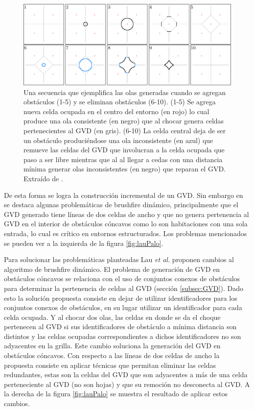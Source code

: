 \begin{figure}[H]
  \center
  \includegraphics[width=1\linewidth]{imagenes/wavesKalra.png}
  \caption[Olas de brushfire dinámico.]{Una secuencia que ejemplifica las olas generadas cuando se agregan obstáculos (1-5) y se eliminan obstáculos (6-10). (1-5) Se agrega nueva celda ocupada en el centro del entorno (en rojo) lo cual produce una ola consistente (en negro) que al chocar genera celdas pertenecientes al GVD (en gris). (6-10) La celda central deja de ser un obstáculo produciéndose una ola inconsistente (en azul) que remueve las celdas del GVD que involucran a la celda ocupada que paso a ser libre mientras que al al llegar a cedas con una distancia mínima generar olas inconsistentes (en negro) que reparan el GVD. Extraído de \cite{kalra2009incremental}.}\label{fig:ejWavesIncKarlra}
\end{figure} 


De esta forma se logra la construcción incremental de un GVD. Sin embargo en \cite{Lau2013} se destaca algunas problemáticas de brushfire dinámico, principalmente que el GVD generado tiene líneas de dos celdas de ancho y que no genera pertenencia al GVD en el interior de obstáculos cóncavos como lo son habitaciones con una sola entrada, lo cual es crítico en entornos estructurados. Los problemas mencionados se pueden ver a la izquierda de la figura \ref{fig:lauPalo}.

Para solucionar las problemáticas planteadas Lau \textit{et al.}
proponen cambios al algoritmo de brushfire dinámico. El problema de
generación de GVD en obstáculos cóncavos se relaciona con el uso de
conjuntos conexos de obstáculos para determinar la pertenencia de celdas
al GVD (sección \ref{subsec:GVD}). Dado esto la solución propuesta
consiste en dejar de utilizar identificadores para los conjuntos conexos
de obstáculos, en su lugar utilizar un identificador para cada celda
ocupada. Y al chocar dos olas, las celdas en donde se da el choque
pertenecen al GVD si sus identificadores de obstáculo a mínima distancia
son distintos y las celdas ocupadas correspondientes a dichos
identificadores no son adyacentes en la grilla. Este cambio soluciona la
generación del GVD en obstáculos cóncavos. Con respecto a las líneas de
dos celdas de ancho la propuesta consiste en aplicar técnicas que
permitan eliminar las celdas redundantes, estas son la celdas del GVD
que son adyacentes a más de una celda perteneciente al GVD (no son
hojas) y que su remoción no desconecta al GVD. A la derecha de la figura
\ref{fig:lauPalo} se muestra el resultado de aplicar estos cambios.

